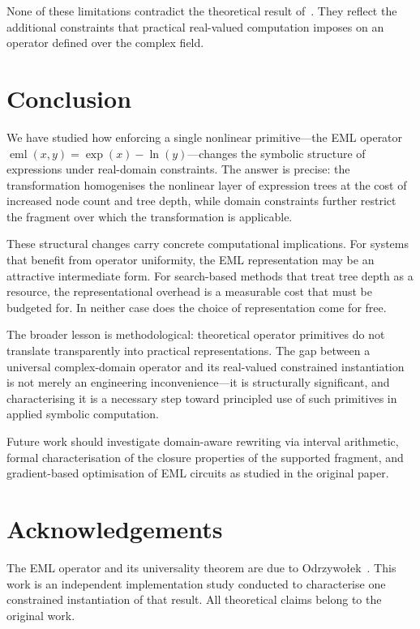 \documentclass[11pt,a4paper]{article}
\newcommand{\eml}{\operatorname{eml}}
\newcommand{\expf}{\operatorname{exp}}
\newcommand{\lnf}{\operatorname{ln}}
\begin{document}
None of these limitations contradict the theoretical result
of~\cite{odrzywolek2026eml}. They reflect the additional constraints
that practical real-valued computation imposes on an operator defined
over the complex field.

\section{Conclusion}
\label{sec:conclusion}

We have studied how enforcing a single nonlinear primitive---the EML
operator $\eml(x,y) = \expf(x) - \lnf(y)$---changes the symbolic
structure of expressions under real-domain constraints. The answer is
precise: the transformation homogenises the nonlinear layer of expression
trees at the cost of increased node count and tree depth, while domain
constraints further restrict the fragment over which the transformation
is applicable.

These structural changes carry concrete computational implications. For
systems that benefit from operator uniformity, the EML representation
may be an attractive intermediate form. For search-based methods that
treat tree depth as a resource, the representational overhead is a
measurable cost that must be budgeted for. In neither case does the
choice of representation come for free.

The broader lesson is methodological: theoretical operator primitives
do not translate transparently into practical representations. The gap
between a universal complex-domain operator and its real-valued
constrained instantiation is not merely an engineering inconvenience---it
is structurally significant, and characterising it is a necessary step
toward principled use of such primitives in applied symbolic computation.

Future work should investigate domain-aware rewriting via interval
arithmetic, formal characterisation of the closure properties of the
supported fragment, and gradient-based optimisation of EML circuits
as studied in the original paper.

\section*{Acknowledgements}
The EML operator and its universality theorem are due to
Odrzywołek~\cite{odrzywolek2026eml}. This work is an independent
implementation study conducted to characterise one constrained
instantiation of that result. All theoretical claims belong to
the original work.
\end{document}
